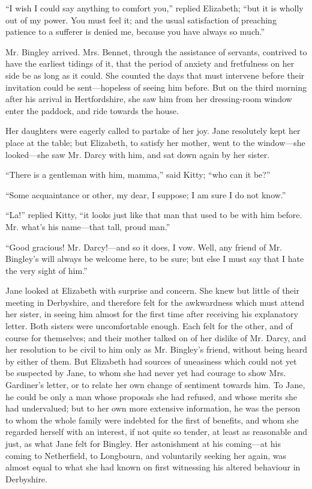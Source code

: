 ``I wish I could say anything to comfort you,'' replied Elizabeth; ``but it is wholly out of my power. You must feel it; and the usual satisfaction of preaching patience to a sufferer is denied me, because you have always so much.''

Mr. Bingley arrived. Mrs. Bennet, through the assistance of servants, contrived to have the earliest tidings of it, that the period of anxiety and fretfulness on her side be as long as it could. She counted the days that must intervene before their invitation could be sent---hopeless of seeing him before. But on the third morning after his arrival in Hertfordshire, she saw him from her dressing-room window enter the paddock, and ride towards the house.

Her daughters were eagerly called to partake of her joy. Jane resolutely kept her place at the table; but Elizabeth, to satisfy her mother, went to the window---she looked---she saw Mr. Darcy with him, and sat down again by her sister.

``There is a gentleman with him, mamma,'' said Kitty; ``who can it be?''

``Some acquaintance or other, my dear, I suppose; I am sure I do not know.''

``La!'' replied Kitty, ``it looks just like that man that used to be with him before. Mr. what's his name---that tall, proud man.''

``Good gracious! Mr. Darcy!---and so it does, I vow. Well, any friend of Mr. Bingley's will always be welcome here, to be sure; but else I must say that I hate the very sight of him.''

Jane looked at Elizabeth with surprise and concern. She knew but little of their meeting in Derbyshire, and therefore felt for the awkwardness which must attend her sister, in seeing him almost for the first time after receiving his explanatory letter. Both sisters were uncomfortable enough. Each felt for the other, and of course for themselves; and their mother talked on of her dislike of Mr. Darcy, and her resolution to be civil to him only as Mr. Bingley's friend, without being heard by either of them. But Elizabeth had sources of uneasiness which could not yet be suspected by Jane, to whom she had never yet had courage to show Mrs. Gardiner's letter, or to relate her own change of sentiment towards him. To Jane, he could be only a man whose proposals she had refused, and whose merits she had undervalued; but to her own more extensive information, he was the person to whom the whole family were indebted for the first of benefits, and whom she regarded herself with an interest, if not quite so tender, at least as reasonable and just, as what Jane felt for Bingley. Her astonishment at his coming---at his coming to Netherfield, to Longbourn, and voluntarily seeking her again, was almost equal to what she had known on first witnessing his altered behaviour in Derbyshire.

